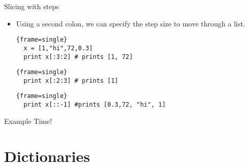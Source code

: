 \documentclass{beamer}
\begin{document}
\begin{frame}[fragile]{Slicing with steps}
  \begin{itemize}
  \item {
  Using a second colon, we can specify the step size to move through a list.
  \begin{block}{}
  \begin{lstlisting}{frame=single}
  x = [1,"hi",72,0.3]
  print x[:3:2] # prints [1, 72]
  \end{lstlisting}
\end{block}
  \pause
  \begin{block}{}
  \begin{lstlisting}{frame=single}
  print x[:2:3] # prints [1] 
  \end{lstlisting}
\end{block}
  \pause
  \begin{block}{}
  \begin{lstlisting}{frame=single}
  print x[::-1] #prints [0.3,72, "hi", 1] 
  \end{lstlisting}
\end{block}
  }
  \end{itemize}
  

\end{frame}
\begin{frame}
	Example Time!
\end{frame}

\section{Dictionaries}
\end{document}
